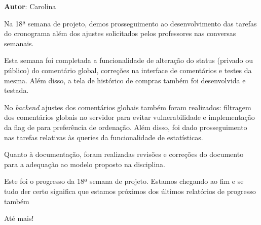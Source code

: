 \textbf{Autor}: Carolina

Na 18ª semana de projeto, demos prosseguimento ao desenvolvimento das tarefas do cronograma além dos ajustes solicitados pelos professores nas conversas semanais.

Esta semana foi completada a funcionalidade de alteração do status (privado ou público) do comentário global, correções na interface de comentários e testes da mesma. Além disso, a tela de histórico de compras também foi desenvolvida e testada.

No \textit{\gls{backend}} ajustes dos comentários globais também foram realizados: filtragem dos comentários globais no servidor para evitar vulnerabilidade e implementação da flag de para preferência de ordenação. Além disso, foi dado prosseguimento nas tarefas relativas às queries da funcionalidade de estatísticas.

Quanto à documentação, foram realizadas revisões e correções do documento para a adequação ao modelo proposto na disciplina.

Este foi o progresso da 18ª semana de projeto. Estamos chegando ao fim e se tudo der certo significa que estamos próximos dos últimos relatórios de progresso também

Até mais!